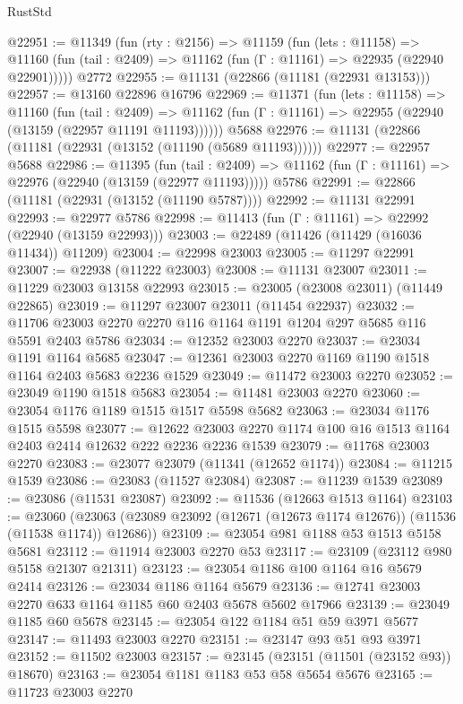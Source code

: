 \begin{lexlean}{RustStd}
\begin{coremodule}
@22951 := @11349
    (fun (rty : @2156) =>
    @11159
      (fun (lets : @11158) =>
      @11160 (fun (tail : @2409) => @11162 (fun (Γ : @11161) => @22935 (@22940 @22901)))))
    @2772
@22955 := @11131 (@22866 (@11181 (@22931 @13153)))
@22957 := @13160 @22896 @16796
@22969 := @11371
    (fun (lets : @11158) =>
    @11160
      (fun (tail : @2409) =>
      @11162 (fun (Γ : @11161) => @22955 (@22940 (@13159 (@22957 @11191 @11193))))))
    @5688
@22976 := @11131 (@22866 (@11181 (@22931 (@13152 (@11190 (@5689 @11193))))))
@22977 := @22957 @5688
@22986 := @11395
    (fun (tail : @2409) => @11162 (fun (Γ : @11161) => @22976 (@22940 (@13159 (@22977 @11193)))))
    @5786
@22991 := @22866 (@11181 (@22931 (@13152 (@11190 @5787))))
@22992 := @11131 @22991
@22993 := @22977 @5786
@22998 := @11413 (fun (Γ : @11161) => @22992 (@22940 (@13159 @22993)))
@23003 := @22489 (@11426 (@11429 (@16036 @11434)) @11209)
@23004 := @22998 @23003
@23005 := @11297 @22991
@23007 := @22938 (@11222 @23003)
@23008 := @11131 @23007
@23011 := @11229 @23003 @13158 @22993
@23015 := @23005 (@23008 @23011) (@11449 @22865)
@23019 := @11297 @23007 @23011 (@11454 @22937)
@23032 := @11706 @23003 @2270 @2270 @116 @1164 @1191 @1204 @297 @5685 @116 @5591 @2403 @5786
@23034 := @12352 @23003 @2270
@23037 := @23034 @1191 @1164 @5685
@23047 := @12361 @23003 @2270 @1169 @1190 @1518 @1164 @2403 @5683 @2236 @1529
@23049 := @11472 @23003 @2270
@23052 := @23049 @1190 @1518 @5683
@23054 := @11481 @23003 @2270
@23060 := @23054 @1176 @1189 @1515 @1517 @5598 @5682
@23063 := @23034 @1176 @1515 @5598
@23077 := @12622 @23003 @2270 @1174 @100 @16 @1513 @1164 @2403 @2414 @12632 @222 @2236 @2236 @1539
@23079 := @11768 @23003 @2270
@23083 := @23077 @23079 (@11341 (@12652 @1174))
@23084 := @11215 @1539
@23086 := @23083 (@11527 @23084)
@23087 := @11239 @1539
@23089 := @23086 (@11531 @23087)
@23092 := @11536 (@12663 @1513 @1164)
@23103 := @23060
    (@23063 (@23089 @23092 (@12671 (@12673 @1174 @12676)) (@11536 (@11538 @1174)) @12686))
@23109 := @23054 @981 @1188 @53 @1513 @5158 @5681
@23112 := @11914 @23003 @2270 @53
@23117 := @23109 (@23112 @980 @5158 @21307 @21311)
@23123 := @23054 @1186 @100 @1164 @16 @5679 @2414
@23126 := @23034 @1186 @1164 @5679
@23136 := @12741 @23003 @2270 @633 @1164 @1185 @60 @2403 @5678 @5602 @17966
@23139 := @23049 @1185 @60 @5678
@23145 := @23054 @122 @1184 @51 @59 @3971 @5677
@23147 := @11493 @23003 @2270
@23151 := @23147 @93 @51 @93 @3971
@23152 := @11502 @23003
@23157 := @23145 (@23151 (@11501 (@23152 @93)) @18670)
@23163 := @23054 @1181 @1183 @53 @58 @5654 @5676
@23165 := @11723 @23003 @2270

\end{coremodule}
\end{lexlean}
